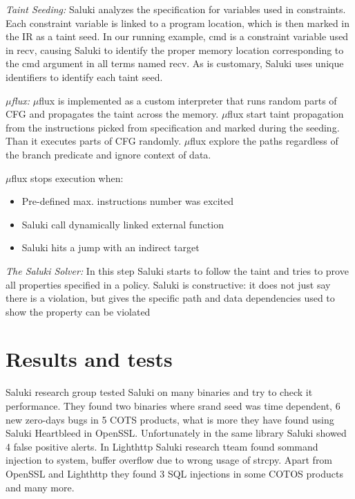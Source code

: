 \documentclass[a4paper, 12pt, journal, onecolumn]{IEEEtran}
\begin{document}
\textit{Taint Seeding:} Saluki analyzes the specification for variables used in constraints. Each constraint variable is linked to
a program location, which is then marked in the IR as a taint
seed. In our running example, cmd is a constraint variable used
in recv, causing Saluki to identify the proper memory location
corresponding to the cmd argument in all terms named recv.
As is customary, Saluki uses unique identifiers to identify each
taint seed.\cite{saluki}
\bigskip

\textit{$\mu$flux:} $\mu$flux is implemented as a custom interpreter that runs random parts of CFG and propagates the taint across the memory. $\mu$flux start taint propagation from the instructions picked from specification and marked during the seeding. Than it executes parts of CFG randomly. $\mu$flux explore the paths regardless of the branch predicate and ignore context of data.
\medskip

$\mu$flux stops execution when:
\begin{itemize}
\item Pre-defined max. instructions number was excited
\item Saluki call dynamically linked external function
\item Saluki hits a jump with an indirect target
\end{itemize}

\bigskip
\textit{The Saluki Solver:} In this step Saluki starts to follow the taint and tries to prove all properties specified in a policy. Saluki is constructive: it does not just say there is a violation, but gives the specific path and data dependencies used to show the property can be violated 



\section{Results and tests}

Saluki research group tested Saluki on many binaries and try to check it performance. They found two binaries where srand seed was time dependent, 6 new zero-days bugs in 5 COTS products, what is more they have found using Saluki Heartbleed in OpenSSL. Unfortunately in the same library Saluki showed 4 false positive alerts.
In Lighthttp Saluki research tteam found sommand injection to system, buffer overflow due to wrong usage of strcpy. Apart from OpenSSL and Lighthttp they found 3 SQL injections in some COTOS products and many more.
\end{document}
